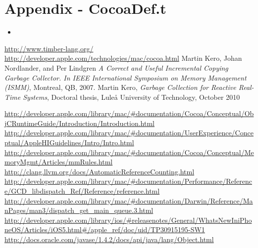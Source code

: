 \documentclass[a4paper]{article}
\newcommand{\timbercode}[2]
  {\begin{itemize}\item[]\end{itemize}}
\begin{document}
\newpage
\section{Appendix - CocoaDef.t}
\timbercode{cocoaDef}{}
\begin{thebibliography}{9}
 \url{http://www.timber-lang.org/}
 \url{http://developer.apple.com/technologies/mac/cocoa.html}
 Martin Kero, Johan Nordlander, and Per Lindgren
 \emph{A Correct and Useful Incremental Copying Garbage Collector. In IEEE International Symposium on Memory Management (ISMM)},
 Montreal, QB, 
 2007.
  Martin Kero,
   \emph{Garbage Collection for Reactive Real-Time Systems}, 
  Doctoral thesis, Luleå University of Technology, 
  October 2010

 \url{http://developer.apple.com/library/mac/#documentation/Cocoa/Conceptual/ObjCRuntimeGuide/Introduction/Introduction.html}
 \url{http://developer.apple.com/library/mac/#documentation/UserExperience/Conceptual/AppleHIGuidelines/Intro/Intro.html}
 \url{http://developer.apple.com/library/mac/#documentation/Cocoa/Conceptual/MemoryMgmt/Articles/mmRules.html}
 \url{http://clang.llvm.org/docs/AutomaticReferenceCounting.html}
 \url{http://developer.apple.com/library/mac/#documentation/Performance/Reference/GCD_libdispatch_Ref/Reference/reference.html}
\url{http://developer.apple.com/library/mac/#documentation/Darwin/Reference/ManPages/man3/dispatch_get_main_queue.3.html}
 \url{http://developer.apple.com/library/ios/#releasenotes/General/WhatsNewIniPhoneOS/Articles/iOS5.html#/apple_ref/doc/uid/TP30915195-SW1}
\url{http://docs.oracle.com/javase/1.4.2/docs/api/java/lang/Object.html}
\end{thebibliography}
\end{document}
